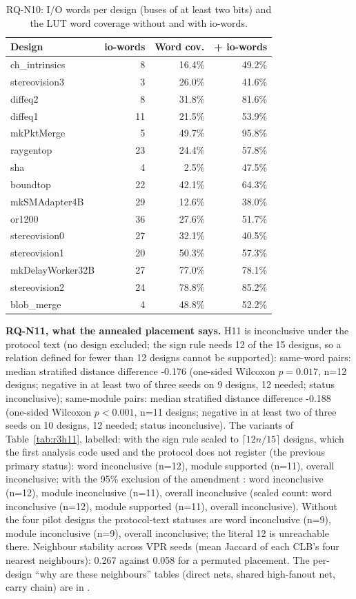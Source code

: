 \begin{table}[t]
\caption{RQ-N10: I/O words per design (buses of at least two bits) and the LUT word coverage without and with io-words.}
\label{tab:r3n10}
\centering
\footnotesize\setlength{\tabcolsep}{3pt}
\begin{tabular}{lrrr}
\toprule
Design & io-words & Word cov. & + io-words \\
\midrule
ch\_intrinsics & 8 & 16.4\% & 49.2\% \\
stereovision3 & 3 & 26.0\% & 41.6\% \\
diffeq2 & 8 & 31.8\% & 81.6\% \\
diffeq1 & 11 & 21.5\% & 53.9\% \\
mkPktMerge & 5 & 49.7\% & 95.8\% \\
raygentop & 23 & 24.4\% & 57.8\% \\
sha & 4 & 2.5\% & 47.5\% \\
boundtop & 22 & 42.1\% & 64.3\% \\
mkSMAdapter4B & 29 & 12.6\% & 38.0\% \\
or1200 & 36 & 27.6\% & 51.7\% \\
stereovision0 & 27 & 32.1\% & 40.5\% \\
stereovision1 & 20 & 50.3\% & 57.3\% \\
mkDelayWorker32B & 27 & 77.0\% & 78.1\% \\
stereovision2 & 24 & 78.8\% & 85.2\% \\
blob\_merge & 4 & 48.8\% & 52.2\% \\
\bottomrule
\end{tabular}
\end{table}

\textbf{RQ-N11, what the annealed placement says.} H11 is inconclusive under the protocol text (no design excluded; the sign
rule needs 12 of the 15 designs, so a relation defined for fewer than 12 designs cannot be supported): same-word pairs: median stratified distance difference -0.176 (one-sided Wilcoxon $p=0.017$, n=12 designs; negative in at least two of three seeds on 9 designs, 12 needed; status inconclusive); same-module pairs: median stratified distance difference -0.188 (one-sided Wilcoxon $p<0.001$, n=11 designs; negative in at least two of three seeds on 10 designs, 12 needed; status inconclusive).
The variants of Table~\ref{tab:r3h11}, labelled: with the sign rule scaled to $\lceil 12n/15\rceil$ designs, which the
first analysis code used and the protocol does not register (the previous primary status): word inconclusive (n=12), module supported (n=11), overall inconclusive; with the 95\%
exclusion of the amendment : word inconclusive (n=12), module inconclusive (n=11), overall inconclusive (scaled count: word inconclusive (n=12), module supported (n=11), overall inconclusive). Without the four pilot designs the protocol-text
statuses are word inconclusive (n=9), module inconclusive (n=9), overall inconclusive; the literal 12 is unreachable there. Neighbour stability across VPR seeds (mean Jaccard of each CLB's four nearest neighbours): 0.267 against 0.058 for a permuted placement. The per-design ``why are these neighbours'' tables
(direct nets, shared high-fanout net, carry chain) are in .


